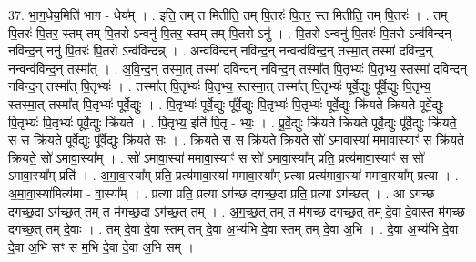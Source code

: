 \documentclass[17pt]{extarticle}
\begin{document}
37. भा॒ग॒धेय॒मिति॑ भाग - धेय᳚म् । . इति॒ तम् त मितीति॒ तम् पि॒तरः॑ पि॒तर॒ स्त मितीति॒ तम् पि॒तरः॑ । . तम् पि॒तरः॑ पि॒तर॒ स्तम् तम् पि॒तरो ऽन्वनु॑ पि॒तर॒ स्तम् तम् पि॒तरो ऽनु॑ । . पि॒तरो ऽन्वनु॑ पि॒तरः॑ पि॒तरो ऽन्व॑विन्दन् नविन्द॒न् ननु॑ पि॒तरः॑ पि॒तरो ऽन्व॑विन्दन्न् । . अन्व॑विन्दन् नविन्द॒न् नन्वन्व॑विन्द॒न् तस्मा॒त् तस्मा॑ दविन्द॒न् नन्वन्व॑विन्द॒न् तस्मा᳚त् । . अ॒वि॒न्द॒न् तस्मा॒त् तस्मा॑ दविन्दन् नविन्द॒न् तस्मा᳚त् पि॒तृभ्यः॑ पि॒तृभ्य॒ स्तस्मा॑ दविन्दन् नविन्द॒न् तस्मा᳚त् पि॒तृभ्यः॑ । . तस्मा᳚त् पि॒तृभ्यः॑ पि॒तृभ्य॒ स्तस्मा॒त् तस्मा᳚त् पि॒तृभ्यः॑ पूर्वे॒द्युः पू᳚र्वे॒द्युः पि॒तृभ्य॒ स्तस्मा॒त् तस्मा᳚त् पि॒तृभ्यः॑ पूर्वे॒द्युः । . पि॒तृभ्यः॑ पूर्वे॒द्युः पू᳚र्वे॒द्युः पि॒तृभ्यः॑ पि॒तृभ्यः॑ पूर्वे॒द्युः क्रि॑यते क्रियते पूर्वे॒द्युः पि॒तृभ्यः॑ पि॒तृभ्यः॑ पूर्वे॒द्युः क्रि॑यते । . पि॒तृभ्य॒ इति॑ पि॒तृ - भ्यः॒ । . पू॒र्वे॒द्युः क्रि॑यते क्रियते पूर्वे॒द्युः पू᳚र्वे॒द्युः क्रि॑यते॒ स स क्रि॑यते पूर्वे॒द्युः पू᳚र्वे॒द्युः क्रि॑यते॒ सः । . क्रि॒य॒ते॒ स स क्रि॑यते क्रियते॒ सो॑ ऽमावा॒स्या॑ ममावा॒स्याꣳ॑ स क्रि॑यते क्रियते॒ सो॑ ऽमावा॒स्या᳚म् । . सो॑ ऽमावा॒स्या॑ ममावा॒स्याꣳ॑ स सो॑ ऽमावा॒स्या᳚म् प्रति॒ प्रत्य॑मावा॒स्याꣳ॑ स सो॑ ऽमावा॒स्या᳚म् प्रति॑ । . अ॒मा॒वा॒स्या᳚म् प्रति॒ प्रत्य॑मावा॒स्या॑ ममावा॒स्या᳚म् प्रत्या प्रत्य॑मावा॒स्या॑ ममावा॒स्या᳚म् प्रत्या । . अ॒मा॒वा॒स्या॑मित्य॑मा - वा॒स्या᳚म् । . प्रत्या प्रति॒ प्रत्या ऽग॑च्छ दगच्छ॒दा प्रति॒ प्रत्या ऽग॑च्छत् । . आ ऽग॑च्छ दगच्छ॒दा ऽग॑च्छ॒त् तम् त म॑गच्छ॒दा ऽग॑च्छ॒त् तम् । . अ॒ग॒च्छ॒त् तम् त म॑गच्छ दगच्छ॒त् तम् दे॒वा दे॒वास्त म॑गच्छ दगच्छ॒त् तम् दे॒वाः । . तम् दे॒वा दे॒वा स्तम् तम् दे॒वा अ॒भ्य॑भि दे॒वा स्तम् तम् दे॒वा अ॒भि । . दे॒वा अ॒भ्य॑भि दे॒वा दे॒वा अ॒भि सꣳ स म॒भि दे॒वा दे॒वा अ॒भि सम् । \newline
\end{document}
